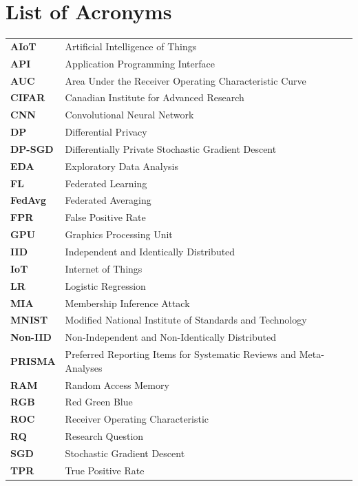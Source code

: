 \documentclass[12pt, a4paper]{report}
\begin{document}
\setcounter{page}{1}
\newpage
\tableofcontents
\newpage

\chapter*{List of Acronyms}
\begin{tabular}{p{3.5cm} p{10cm}}
  \textbf{AIoT}    & Artificial Intelligence of Things \\[4pt]
  \textbf{API}     & Application Programming Interface \\[4pt]
  \textbf{AUC}     & Area Under the Receiver Operating Characteristic Curve \\[4pt]
  \textbf{CIFAR}   & Canadian Institute for Advanced Research \\[4pt]
  \textbf{CNN}     & Convolutional Neural Network \\[4pt]
  \textbf{DP}      & Differential Privacy \\[4pt]
  \textbf{DP-SGD}  & Differentially Private Stochastic Gradient Descent \\[4pt]
  \textbf{EDA}     & Exploratory Data Analysis \\[4pt]
  \textbf{FL}      & Federated Learning \\[4pt]
  \textbf{FedAvg}  & Federated Averaging \\[4pt]
  \textbf{FPR}     & False Positive Rate \\[4pt]
  \textbf{GPU}     & Graphics Processing Unit \\[4pt]
  \textbf{IID}     & Independent and Identically Distributed \\[4pt]
  \textbf{IoT}     & Internet of Things \\[4pt]
  \textbf{LR}      & Logistic Regression \\[4pt]
  \textbf{MIA}     & Membership Inference Attack \\[4pt]
  \textbf{MNIST}   & Modified National Institute of Standards and Technology \\[4pt]
  \textbf{Non-IID} & Non-Independent and Non-Identically Distributed \\[4pt]
  \textbf{PRISMA}  & Preferred Reporting Items for Systematic Reviews and Meta-Analyses \\[4pt]
  \textbf{RAM}     & Random Access Memory \\[4pt]
  \textbf{RGB}     & Red Green Blue \\[4pt]
  \textbf{ROC}     & Receiver Operating Characteristic \\[4pt]
  \textbf{RQ}      & Research Question \\[4pt]
  \textbf{SGD}     & Stochastic Gradient Descent \\[4pt]
  \textbf{TPR}     & True Positive Rate \\[4pt]
\end{tabular}
\newpage
\end{document}
